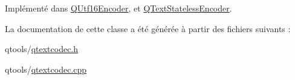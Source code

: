 Implémenté dans \hyperlink{class_q_utf16_encoder_abe6f23ccae2a17021d4906e9f5e76ae6}{Q\+Utf16\+Encoder}, et \hyperlink{class_q_text_stateless_encoder_a8466950847e702e588d182a582ba660f}{Q\+Text\+Stateless\+Encoder}.



La documentation de cette classe a été générée à partir des fichiers suivants \+:\begin{DoxyCompactItemize}
\item 
qtools/\hyperlink{qtextcodec_8h}{qtextcodec.\+h}\item 
qtools/\hyperlink{qtextcodec_8cpp}{qtextcodec.\+cpp}\end{DoxyCompactItemize}
